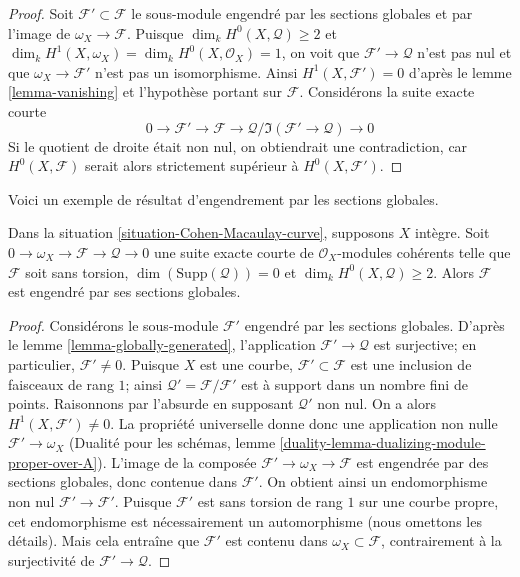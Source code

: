 \begin{proof}
Soit $\mathcal{F}' \subset \mathcal{F}$ le sous-module engendré par les sections globales et par l'image de $\omega_X \to \mathcal{F}$. Puisque $\dim_k H^0(X, \mathcal{Q}) \geq 2$ et $\dim_k H^1(X, \omega_X) = \dim_k H^0(X, \mathcal{O}_X) = 1$, on voit que $\mathcal{F}' \to \mathcal{Q}$ n'est pas nul et que $\omega_X \to \mathcal{F}'$ n'est pas un isomorphisme. Ainsi $H^1(X, \mathcal{F}') = 0$ d'après le lemme \ref{lemma-vanishing} et l'hypothèse portant sur $\mathcal{F}$. Considérons la suite exacte courte $$
0 \to \mathcal{F}' \to \mathcal{F} \to
\mathcal{Q}/\Im(\mathcal{F}' \to \mathcal{Q}) \to 0
$$ Si le quotient de droite était non nul, on obtiendrait une contradiction, car $H^0(X, \mathcal{F})$ serait alors strictement supérieur à $H^0(X, \mathcal{F}')$.
\end{proof}

\noindent
Voici un exemple de résultat d'engendrement par les sections globales.

\begin{lemma}
\label{lemma-globally-generated-curve}
Dans la situation \ref{situation-Cohen-Macaulay-curve}, supposons $X$ intègre. Soit $0 \to \omega_X \to \mathcal{F} \to \mathcal{Q} \to 0$ une suite exacte courte de $\mathcal{O}_X$-modules cohérents telle que $\mathcal{F}$ soit sans torsion, $\dim(\text{Supp}(\mathcal{Q})) = 0$ et $\dim_k H^0(X, \mathcal{Q}) \geq 2$. Alors $\mathcal{F}$ est engendré par ses sections globales.
\end{lemma}

\begin{proof}
Considérons le sous-module $\mathcal{F}'$ engendré par les sections globales. D'après le lemme \ref{lemma-globally-generated}, l'application $\mathcal{F}' \to \mathcal{Q}$ est surjective; en particulier, $\mathcal{F}' \not = 0$. Puisque $X$ est une courbe, $\mathcal{F}' \subset \mathcal{F}$ est une inclusion de faisceaux de rang $1$; ainsi $\mathcal{Q}' = \mathcal{F}/\mathcal{F}'$ est à support dans un nombre fini de points. Raisonnons par l'absurde en supposant $\mathcal{Q}'$ non nul. On a alors $H^1(X, \mathcal{F}') \not = 0$. La propriété universelle donne donc une application non nulle $\mathcal{F}' \to \omega_X$ (Dualité pour les schémas, lemme \ref{duality-lemma-dualizing-module-proper-over-A}). L'image de la composée $\mathcal{F}' \to \omega_X \to \mathcal{F}$ est engendrée par des sections globales, donc contenue dans $\mathcal{F}'$. On obtient ainsi un endomorphisme non nul $\mathcal{F}' \to \mathcal{F}'$. Puisque $\mathcal{F}'$ est sans torsion de rang $1$ sur une courbe propre, cet endomorphisme est nécessairement un automorphisme (nous omettons les détails). Mais cela entraîne que $\mathcal{F}'$ est contenu dans $\omega_X \subset \mathcal{F}$, contrairement à la surjectivité de $\mathcal{F}' \to \mathcal{Q}$.
\end{proof}

